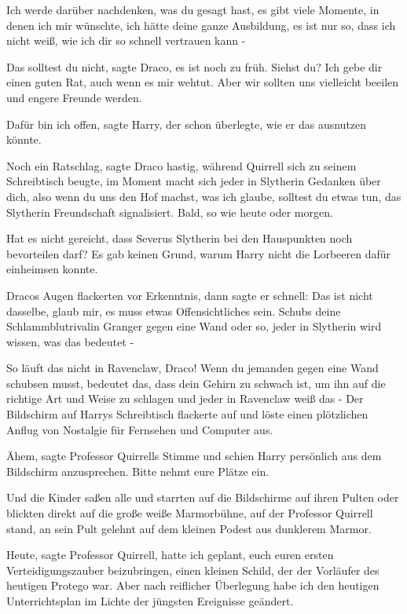 \glqq Ich werde darüber nachdenken, was du gesagt hast, es gibt viele Momente,
in denen ich mir wünschte, ich hätte deine ganze Ausbildung, es ist nur so, dass
ich nicht weiß, wie ich dir so schnell vertrauen kann -\grqq{}

\glqq Das solltest du nicht\grqq{}, sagte Draco, \glqq es ist noch zu früh.
Siehst du? Ich gebe dir einen guten Rat, auch wenn es mir wehtut. Aber wir
sollten uns vielleicht beeilen und engere Freunde werden.\grqq{}

\glqq Dafür bin ich offen\grqq{}, sagte Harry, der schon überlegte, wie er das
ausnutzen könnte.

\glqq Noch ein Ratschlag\grqq{}, sagte Draco hastig, während Quirrell sich zu
seinem Schreibtisch beugte, \glqq im Moment macht sich jeder in Slytherin
Gedanken über dich, also wenn du uns den Hof machst, was ich glaube, solltest du
etwas tun, das Slytherin Freundschaft signalisiert. Bald, so wie heute oder
morgen.\grqq{}

\glqq Hat es nicht gereicht, dass Severus Slytherin bei den Hauspunkten noch
bevorteilen darf?\grqq{} Es gab keinen Grund, warum Harry nicht die Lorbeeren
dafür einheimsen konnte.

Dracos Augen flackerten vor Erkenntnis, dann sagte er schnell: \glqq Das ist
nicht dasselbe, glaub mir, es muss etwas Offensichtliches sein. Schubs deine
Schlammblutrivalin Granger gegen eine Wand oder so, jeder in Slytherin wird
wissen, was das bedeutet -\grqq{}

\glqq So läuft das nicht in Ravenclaw, Draco! Wenn du jemanden gegen eine Wand
schubsen musst, bedeutet das, dass dein Gehirn zu schwach ist, um ihn auf die
richtige Art und Weise zu schlagen und jeder in Ravenclaw weiß das -\grqq{} Der
Bildschirm auf Harrys Schreibtisch flackerte auf und löste einen plötzlichen
Anflug von Nostalgie für Fernsehen und Computer aus.

\glqq Ähem\grqq{}, sagte Professor Quirrells Stimme und schien Harry persönlich
aus dem Bildschirm anzusprechen. \glqq Bitte nehmt eure Plätze ein.\grqq{}

Und die Kinder saßen alle und starrten auf die Bildschirme auf ihren Pulten oder
blickten direkt auf die große weiße Marmorbühne, auf der Professor Quirrell
stand, an sein Pult gelehnt auf dem kleinen Podest aus dunklerem Marmor.

\glqq Heute\grqq{}, sagte Professor Quirrell, \glqq hatte ich geplant, euch
euren ersten Verteidigungszauber beizubringen, einen kleinen Schild, der der
Vorläufer des heutigen Protego war. Aber nach reiflicher Überlegung habe ich den
heutigen Unterrichtsplan im Lichte der jüngsten Ereignisse geändert.\grqq{}

